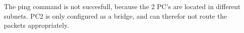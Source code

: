 The ping command is not succesfull, because the 2 PC's are located in different subnets. PC2 is only configured as a bridge, and can therefor not route the packets appropriately.
